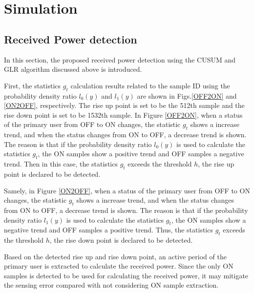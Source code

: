 \chapter[Simulation]{Simulation}
\label{chapter:Result}



\section{Received Power detection}
In this section, the proposed received power detection using the CUSUM and GLR algorithm discussed above is introduced. 

First, the statistics $g_t$ calculation results related to the sample ID using the probability density ratio $l_0(y)$ and $l_1(y)$ are shown in Figs.\ref{OFF2ON} and \ref{ON2OFF}, respectively. The rise up point is set to be the 512th sample and the rise down point is set to be 1532th sample.
In Figure \ref{OFF2ON}, when a status of the primary user from OFF to ON changes, the statistic $g_t$ shows a increase trend, and when the status changes from ON to OFF, a decrease trend is shown. The reason is that if the probability density ratio $l_0(y)$ is used to calculate the statistics $g_t$, the ON samples show a positive trend and OFF samples a negative trend. Then in this case, the statistics $g_t$ exceeds the threshold $h$, the rise up point is declared to be detected.

Samely, in Figure \ref{ON2OFF}, when a status of the primary user from OFF to ON changes, the statistic $g_t$ shows a increase trend, and when the status changes from ON to OFF, a decrease trend is shown. The reason is that if the probability density ratio $l_1(y)$ is used to calculate the statistics $g_t$, the ON samples show a negative trend and OFF samples a positive trend. Thus, the statistics $g_t$ exceeds the threshold $h$, the rise down point is declared to be detected.

Based on the detected rise up and rise down point, an active period of the primary user is extracted to calculate the received power. Since the only ON samples is detected to be used for calculating the received power, it may mitigate the sensing error compared with not considering ON sample extraction.


